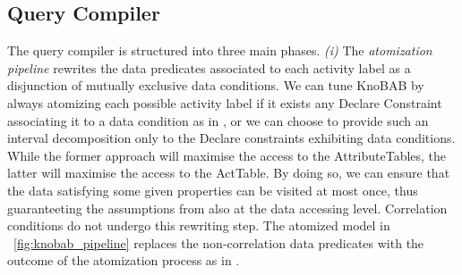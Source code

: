 \subsection{Query Compiler}\label{sec:qc}
The query compiler is structured into three main phases. \textit{(i)} The \textit{atomization pipeline}  rewrites the data predicates 
associated to each activity label as a 
disjunction of mutually exclusive data conditions. We can tune KnoBAB by always atomizing each possible activity label if it exists any Declare Constraint associating it to a data condition as in \cite{bpm21}, or we can choose to provide such an interval decomposition only to the Declare constraints exhibiting data conditions. While the former approach will maximise the access to the \textsf{AttributeTable}s, the latter will maximise the access to the \textsf{ActTable}. By doing so, we can ensure that the data satisfying some given properties can be visited at most once, thus guaranteeting the assumptions from \cite{BellatrecheKB21} also at the data accessing level. Correlation conditions do not undergo this rewriting step. The atomized model in \figurename~\ref{fig:knobab_pipeline} replaces the non-correlation data predicates with the outcome of the atomization process as in \cite{bpm21}. 

